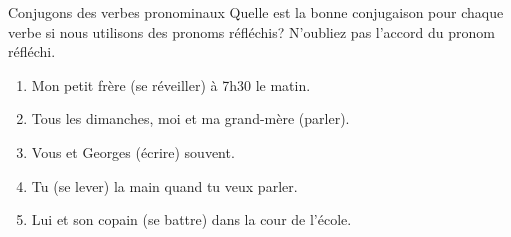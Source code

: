 \begin{frame}{Conjugons des verbes pronominaux}
  Quelle est la bonne conjugaison pour chaque verbe si nous utilisons des pronoms réfléchis?
  N'oubliez pas l'accord du pronom réfléchi.
  \begin{enumerate}
    \item Mon petit frère \underline{} (se réveiller) à 7h30 le matin.
    \item Tous les dimanches, moi et ma grand-mère \underline{} (parler).
    \item Vous et Georges \underline{} (écrire) souvent.
    \item Tu \underline{} (se lever) la main quand tu veux parler.
    \item Lui et son copain \underline{} (se battre) dans la cour de l'école.
  \end{enumerate}
\end{frame}
